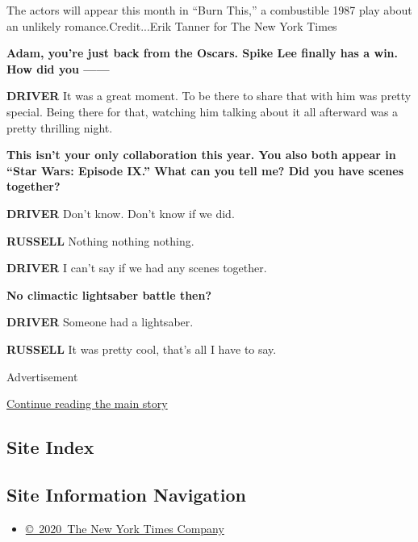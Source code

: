 The actors will appear this month in ``Burn This,'' a combustible 1987
play about an unlikely romance.Credit...Erik Tanner for The New York
Times

\textbf{Adam, you're just back from the Oscars. Spike Lee finally has a
win. How did you ------}

\textbf{DRIVER} It was a great moment. To be there to share that with
him was pretty special. Being there for that, watching him talking about
it all afterward was a pretty thrilling night.

\textbf{This isn't your only collaboration this year. You also both
appear in ``Star Wars: Episode IX.'' What can you tell me? Did you have
scenes together?}

\textbf{DRIVER} Don't know. Don't know if we did.

\textbf{RUSSELL} Nothing nothing nothing.

\textbf{DRIVER} I can't say if we had any scenes together.

\textbf{No climactic lightsaber battle then?}

\textbf{DRIVER} Someone had a lightsaber.

\textbf{RUSSELL} It was pretty cool, that's all I have to say.

Advertisement

\protect\hyperlink{after-bottom}{Continue reading the main story}

\hypertarget{site-index}{%
\subsection{Site Index}\label{site-index}}

\hypertarget{site-information-navigation}{%
\subsection{Site Information
Navigation}\label{site-information-navigation}}

\begin{itemize}
\tightlist
\item
  \href{https://help.nytimes3xbfgragh.onion/hc/en-us/articles/115014792127-Copyright-notice}{©~2020~The
  New York Times Company}
\end{itemize}

